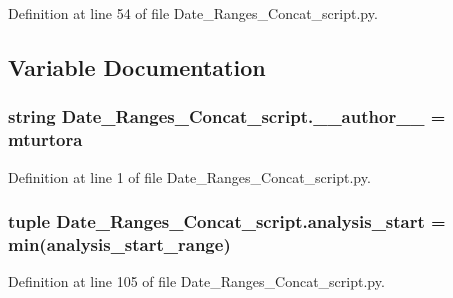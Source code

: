 Definition at line 54 of file Date\+\_\+\+Ranges\+\_\+\+Concat\+\_\+script.\+py.



\subsection{Variable Documentation}
\hypertarget{namespace_date___ranges___concat__script_a50ed371d22d0c321c54a15b48b0f72d7}{}
\subsubsection[{\+\_\+\+\_\+author\+\_\+\+\_\+}]{\setlength{\rightskip}{0pt plus 5cm}string Date\+\_\+\+Ranges\+\_\+\+Concat\+\_\+script.\+\_\+\+\_\+author\+\_\+\+\_\+ = \textquotesingle{}mturtora\textquotesingle{}}\label{namespace_date___ranges___concat__script_a50ed371d22d0c321c54a15b48b0f72d7}


Definition at line 1 of file Date\+\_\+\+Ranges\+\_\+\+Concat\+\_\+script.\+py.

\hypertarget{namespace_date___ranges___concat__script_a6c0eff6e982e3302358a19994f3da706}{}
\subsubsection[{analysis\+\_\+start}]{\setlength{\rightskip}{0pt plus 5cm}tuple Date\+\_\+\+Ranges\+\_\+\+Concat\+\_\+script.\+analysis\+\_\+start = min({\bf analysis\+\_\+start\+\_\+range})}\label{namespace_date___ranges___concat__script_a6c0eff6e982e3302358a19994f3da706}


Definition at line 105 of file Date\+\_\+\+Ranges\+\_\+\+Concat\+\_\+script.\+py.

\hypertarget{namespace_date___ranges___concat__script_a0afaa5d03f9354ea68b7437702c1ceb0}{}
